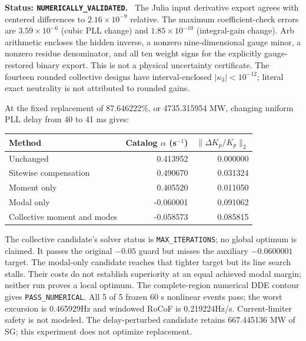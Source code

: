\documentclass[11pt]{article}
\newcommand{\status}[1]{\par\smallskip\noindent\textbf{Status: \texttt{#1}.}\ }
\begin{document}
\status{NUMERICALLY\_VALIDATED}
The Julia input derivative export agrees with centered differences to
$2.16\times10^{-9}$ relative.
The maximum coefficient-check errors are
$3.59\times10^{-6}$ (cubic PLL change)
and $1.85\times10^{-10}$ (integral-gain change).
Arb arithmetic encloses the hidden inverse, a nonzero nine-dimensional gauge
minor, a nonzero residue denominator, and all ten weight signs for the explicitly
gauge-restored binary export. This is not a physical uncertainty certificate.
The fourteen rounded collective designs have interval-enclosed
$|\kappa_3|<10^{-12}$; literal exact neutrality is not attributed to rounded gains.

At the fixed replacement of 87.646222\%, or
4735.315954 MW, changing uniform PLL delay from 40 to 41 ms gives:
\begin{center}
\begin{tabular}{lrr}
\toprule Method & Catalog $\alpha$ (s$^{-1}$) & $\|\Delta K_p/K_p\|_2$\\
\midrule
Unchanged & 0.413952 & 0.000000\\
Sitewise compensation & 0.490670 & 0.031324\\
Moment only & 0.405520 & 0.011050\\
Modal only & -0.060001 & 0.091062\\
Collective moment and modes & -0.058573 & 0.085815\\
\bottomrule
\end{tabular}
\end{center}
The collective candidate's solver status is
\texttt{MAX\_ITERATIONS}; no global optimum is claimed.
It passes the original $-0.05$ guard but misses the auxiliary $-0.0600001$
target. The modal-only candidate reaches that tighter target but its line
search stalls. Their costs do not establish superiority at an equal achieved
modal margin; neither run proves a local optimum.
The complete-region numerical DDE contour gives
\texttt{PASS\_NUMERICAL}.
All 5 of 5 frozen 60 s nonlinear events pass; the
worst excursion is 0.465929Hz and windowed RoCoF is
0.219224Hz/s. Current-limiter safety is not modeled.
The delay-perturbed candidate retains 667.445136 MW of SG;
this experiment does not optimize replacement.
\end{document}
